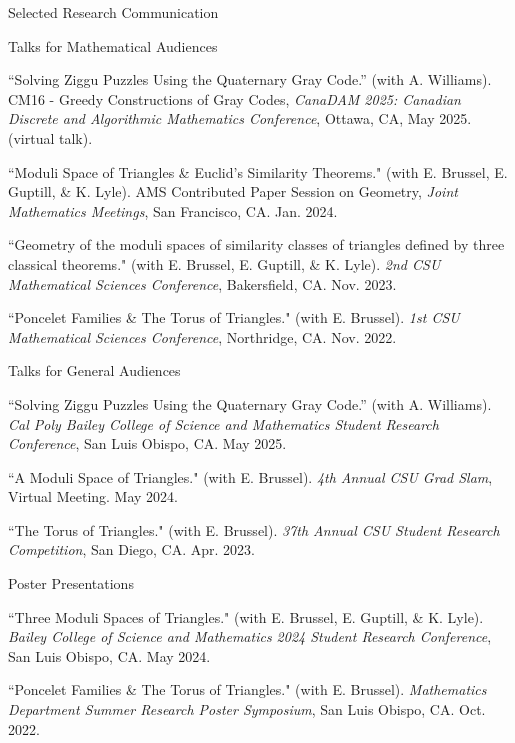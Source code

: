 \documentclass[
	11pt, %
]{cv} %
\begin{document}
\begin{rSection}{Selected Research Communication}

	\begin{rSubsectionNumbered}{Talks for Mathematical Audiences}
		\item ``Solving Ziggu Puzzles Using the Quaternary Gray Code.'' (with A. Williams). CM16 - Greedy Constructions of Gray Codes, \textit{CanaDAM 2025: Canadian Discrete and Algorithmic Mathematics Conference}, Ottawa, CA, May 2025. (virtual talk).
		\item ``Moduli Space of Triangles \& Euclid's Similarity Theorems." (with E. Brussel, E. Guptill, \& K. Lyle). AMS Contributed Paper Session on Geometry, \textit{ Joint Mathematics Meetings},
		San Francisco, CA. Jan. 2024.
		\item ``Geometry of the moduli spaces of similarity classes of triangles defined by three classical theorems." (with E. Brussel, E. Guptill, \& K. Lyle). \textit{ 2nd CSU Mathematical Sciences Conference},
		Bakersfield, CA. Nov. 2023.
		\item ``Poncelet Families \& The Torus of Triangles." (with E. Brussel). \textit{1st CSU Mathematical Sciences Conference},
		Northridge, CA. Nov. 2022.
	\end{rSubsectionNumbered}
	\begin{rSubsectionNumbered}{Talks for General Audiences}
		\item ``Solving Ziggu Puzzles Using the Quaternary Gray Code.'' (with A. Williams). \textit{Cal Poly Bailey College of Science and Mathematics Student Research Conference}, San Luis Obispo, CA. May 2025.
		\item ``A Moduli Space of Triangles." (with E. Brussel). \textit{4th Annual CSU Grad Slam},
		Virtual Meeting. May 2024.
		\item ``The Torus of Triangles." (with E. Brussel). \textit{ 37th Annual CSU Student Research Competition},
		San Diego, CA. Apr. 2023.
	\end{rSubsectionNumbered}
	\begin{rSubsectionNumbered}{Poster Presentations}
		\item ``Three Moduli Spaces of Triangles." (with E. Brussel, E. Guptill, \& K. Lyle).  \textit{Bailey College of Science and Mathematics 2024 Student Research Conference}, San Luis Obispo, CA. May 2024.
		\item ``Poncelet Families \& The Torus of Triangles." (with E. Brussel). \textit{ Mathematics Department Summer Research Poster Symposium}, San Luis Obispo, CA. Oct. 2022.
	\end{rSubsectionNumbered}

	
\end{rSection}
\end{document}
